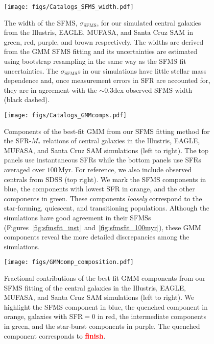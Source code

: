 \documentclass[preprint2,tighten]{aastex62}
\newcommand{\todo}[1]{{\bf \textcolor{red}{ #1}}}
\begin{document}
\begin{figure}
\begin{center}
\texttt{[image: figs/Catalogs\_SFMS\_width.pdf]}
\caption{The width of the SFMS, $\sigma_\mathrm{SFMS}$, for our simulated 
central galaxies from the Illustris, EAGLE, MUFASA, and Santa Cruz SAM in 
green, red, purple, and brown respectively. The widths are derived from  
the GMM SFMS fitting and its uncertainties are estimated using bootstrap
resampling in the same way as the SFMS fit uncertainties. The
$\sigma_\mathrm{SFMS}$s in our simulations have little stellar mass 
dependence and, once measurement errors in SFR are accounted for, they 
are in agreement with the $\sim 0.3\mathrm{dex}$ observed SFMS width 
(black dashed).} \label{fig:sfms_width}
\end{center}
\end{figure}


\begin{figure*}
\begin{center}
\texttt{[image: figs/Catalogs\_GMMcomps.pdf]} 
\caption{Components of the best-fit GMM from our SFMS fitting method for the
SFR-$M_*$ relations of central galaxies in the Illustris, EAGLE, MUFASA, and 
Santa Cruz SAM simulations (left to right). The top panels use instantaneous 
SFRs while the bottom panels use SFRs averaged over $100\,\mathrm{Myr}$. 
For reference, we also include observed centrals from SDSS (top right). We mark 
the SFMS components in blue, the components with lowest SFR in orange, 
and the other components in green. These components {\em loosely} correspond
to the star-forming, quiescent, and transitioning populations. 
Although the simulations have good agreement in their SFMSs
(Figures~\ref{fig:sfmsfit_inst}~and~\ref{fig:sfmsfit_100myr}), these GMM components
reveal the more detailed discrepancies among the simulations. 
} \label{fig:sfmsfit_comps}
\end{center}
\end{figure*}


\begin{figure*}
\begin{center}
\texttt{[image: figs/GMMcomp\_composition.pdf]} 
\caption{Fractional contributions of the best-fit GMM components from 
our SFMS fitting of the central galaxies in the Illustris, EAGLE, MUFASA, 
and Santa Cruz SAM simulations (left to right). We highlight the SFMS 
component in blue, the quenched component in orange, galaxies with 
SFR$=0$ in red, the intermediate components in green, and the star-burst
components in purple. The quenched component corresponds to \todo{finish}. 
} \label{fig:kandinsky}
\end{center}
\end{figure*}
\end{document}
